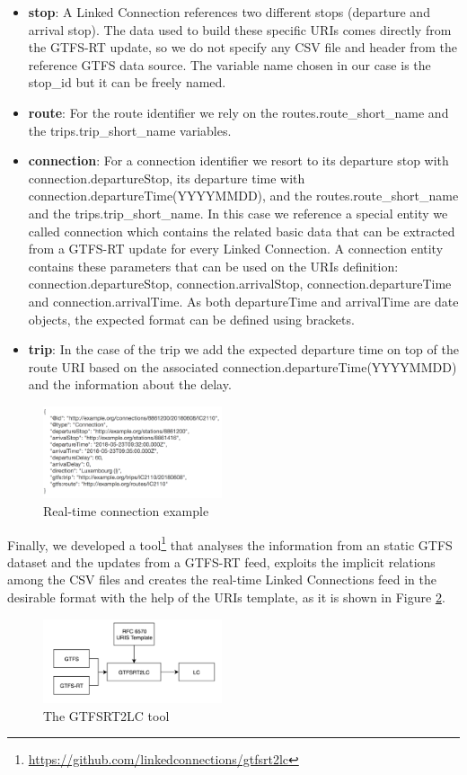 \documentclass[sw]{iosart2x}
\begin{document}
\begin{itemize}
\item \textbf{stop}: A Linked Connection references two different stops (departure and arrival stop). The data used to build these specific URIs comes directly from the GTFS-RT update, so we do not specify any CSV file and header from the reference GTFS data source. The variable name chosen in our case is the stop\_id but it can be freely named.
\item \textbf{route}: For the route identifier we rely on the routes.route\_short\_name and the trips.trip\_short\_name variables.
\item \textbf{connection}:  For a connection identifier we resort to its departure stop with connection.departureStop, its departure time with connection.departureTime(YYYYMMDD), and the routes.route\_short\_name and the trips.trip\_short\_name. In this case we reference a special entity we called connection which contains the related basic data that can be extracted from a GTFS-RT update for every Linked Connection. A connection entity contains these parameters that can be used on the URIs definition: connection.departureStop, connection.arrivalStop, connection.departureTime and connection.arrivalTime. As both departureTime and arrivalTime are date objects, the expected format can be defined using brackets.
\item \textbf{trip}: In the case of the trip we add the expected departure time on top of the route URI based on the associated connection.departureTime(YYYYMMDD) and the information about the delay.
\end{itemize}

\begin{figure}[t]
	\includegraphics[width=0.47\textwidth]{images/example_connection_rt.png}
	\caption{Real-time connection example}\label{fig:connection_rt}
\end{figure}

Finally, we developed a tool\footnote{\url{https://github.com/linkedconnections/gtfsrt2lc}} that analyses the information from an static GTFS dataset and the updates from a GTFS-RT feed, exploits the implicit relations among the CSV files and creates the real-time Linked Connections feed in the desirable format with the help of the URIs template, as it is shown in Figure \ref{fig:gtfsrt2lc}.
\begin{figure}[t]
	\includegraphics[width=0.47\textwidth]{images/gtfsrt2lc.png}
	\caption{The GTFSRT2LC tool}\label{fig:gtfsrt2lc}
\end{figure}
\end{document}

